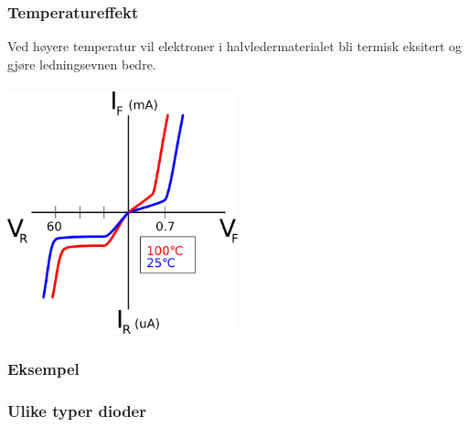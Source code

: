 \subsubsection{Temperatureffekt}
Ved høyere temperatur vil elektroner i halvledermaterialet
bli termisk eksitert og gjøre ledningsevnen bedre.
\\\\
\includegraphics[width=0.5\textwidth]{./img/diodetemp}

\subsubsection{Eksempel}


\subsubsection{Ulike typer dioder}

